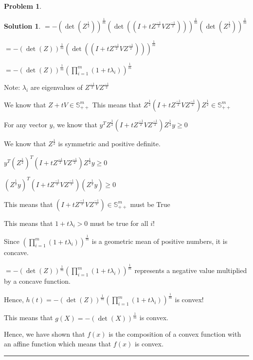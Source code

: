 \documentclass{article}
\theoremstyle{definition}
\newtheorem{problem}{Problem}
\def\fline{\rule{0.75\linewidth}{0.5pt}}
\newcommand{\finishline}{\begin{center}\fline\end{center}}
\newtheorem*{solution*}{Solution}
\newenvironment{solution}{\begin{solution*}}{{\finishline} \end{solution*}}
\begin{document}
\begin{problem}
\begin{itemize}
\begin{solution}
    $= - (\det (Z^{\frac{1}{2}}))^{\frac{1}{m}} (\det ((I + tZ^{\frac{-1}{2}} V Z^{\frac{-1}{2}})))^{\frac{1}{m}} (\det (Z^{\frac{1}{2}}))^{\frac{1}{m}}$ \newline

    $= - (\det (Z))^{\frac{1}{m}} (\det ((I + tZ^{\frac{-1}{2}} V Z^{\frac{-1}{2}})))^{\frac{1}{m}}$ \newline

    $= - (\det (Z))^{\frac{1}{m}} (\prod_{i=1}^{m} (1 + t\lambda_i))^{\frac{1}{m}}$ \newline 

    Note: $\lambda_i$ are eigenvalues of $Z^{\frac{-1}{2}} V Z^{\frac{-1}{2}}$ \newline 

     We know that $Z + tV \in \mathbb{S}^m_{++}$ \newline 
    This means that $Z^{\frac{1}{2}} (I + tZ^{\frac{-1}{2}} V Z^{\frac{-1}{2}}) Z^{\frac{1}{2}} \in \mathbb{S}^m_{++}$ \newline 

    For any vector $y$, we know that $y^T Z^{\frac{1}{2}} (I + tZ^{\frac{-1}{2}} V Z^{\frac{-1}{2}}) Z^{\frac{1}{2}} y \geq 0$ \newline 

    We know that $Z^{\frac{1}{2}}$ is symmetric and positive definite. \newline 

    $y^T (Z^{\frac{1}{2}})^T (I + tZ^{\frac{-1}{2}} V Z^{\frac{-1}{2}}) Z^{\frac{1}{2}} y \geq 0$ \newline 

    $(Z^{\frac{1}{2}} y)^T (I + tZ^{\frac{-1}{2}} V Z^{\frac{-1}{2}}) (Z^{\frac{1}{2}} y) \geq 0$ \newline 
    
    This means that $(I + tZ^{\frac{-1}{2}} V Z^{\frac{-1}{2}}) \in \mathbb{S}^m_{++}$ must be True

    This means that $1 + t\lambda_i > 0$ must be true for all $i$! 


    Since $(\prod_{i=1}^{m} (1 + t\lambda_i))^{\frac{1}{m}}$ is a geometric mean of positive numbers, it is concave. \newline 

    $= - (\det (Z))^{\frac{1}{m}} (\prod_{i=1}^{m} (1 + t\lambda_i))^{\frac{1}{m}}$ represents a negative value multiplied by a concave function. \newline 
    
    Hence, $h(t) = - (\det (Z))^{\frac{1}{m}} (\prod_{i=1}^{m} (1 + t\lambda_i))^{\frac{1}{m}}$ is convex! \newline 

    This means that $g(X) = -(\det(X))^{\frac{1}{m}}$ is convex. 

    Hence, we have shown that $f(x)$ is the composition of a convex function with an affine function which means that $f(x)$ is convex. 

    \end{solution}
\end{itemize}
\end{problem}
\end{document}
